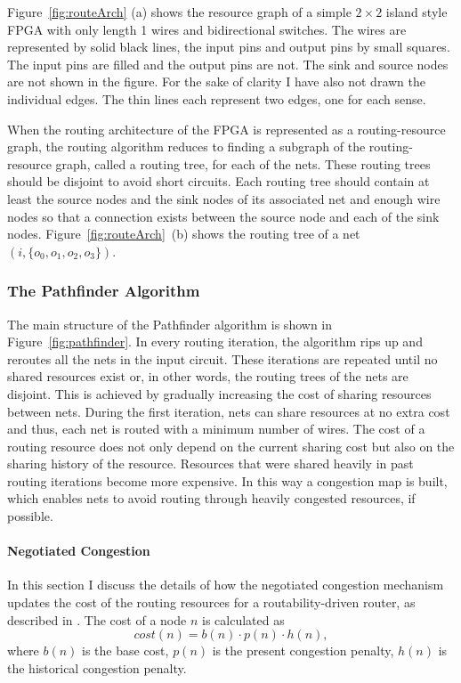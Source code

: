\documentclass[a4paper,oneside,12pt]{article}
\begin{document}

Figure~\ref{fig:routeArch} (a) shows the resource graph of a simple $2\times 2$ island style FPGA with only length 1 wires and bidirectional switches. The wires are represented by solid black lines, the input pins and output pins by small squares. The input pins are filled and the output pins are not. The sink and source nodes are not shown in the figure. For the sake of clarity I have also not drawn the individual edges. The thin lines each represent two edges, one for each sense.


When the routing architecture of the FPGA is represented as a routing-resource graph, the routing algorithm reduces to finding a subgraph of the routing-resource graph, called a routing tree, for each of the nets. These routing trees should be disjoint to avoid short circuits. Each routing tree should contain at least the source nodes and the sink nodes of its associated net and enough wire nodes so that a connection exists between the source node and each of the sink nodes. Figure~\ref{fig:routeArch}~(b) shows the routing tree of a net $(i,\{o_0,o_1,o_2,o_3\})$.

\subsubsection{The Pathfinder Algorithm}
\label{sec:pathfinder}
The main structure of the Pathfinder algorithm \cite{mcmurchie1995panprff} is shown in Figure~\ref{fig:pathfinder}. In every routing iteration, the algorithm rips up and reroutes all the nets in the input circuit. These iterations are repeated until no shared resources exist \cite{nair1987asyetfgw} or, in other words, the routing trees of the nets are disjoint. This is achieved by gradually increasing the cost of sharing resources between nets. During the first iteration, nets can share resources at no extra cost and thus, each net is routed with a minimum number of wires. The cost of a routing resource does not only depend on the current sharing cost but also on the sharing history of the resource. Resources that were shared heavily in past routing iterations become more expensive. In this way a congestion map is built, which enables nets to avoid routing through heavily congested resources, if possible.


\paragraph{Negotiated Congestion}
In this section I discuss the details of how the negotiated congestion mechanism updates the cost of the routing resources for a routability-driven router, as described in \cite{betz1999aacfdf}. The cost of a node $n$ is calculated as
\begin{equation}
cost(n)=b(n)\cdot p(n) \cdot h(n),
\end{equation}
where $b(n)$ is the base cost, $p(n)$ is the present congestion penalty, $h(n)$ is the historical congestion penalty.
\end{document}
